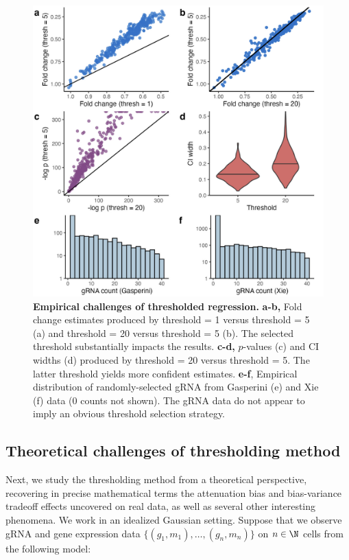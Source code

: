 \documentclass[12pt]{article}
\begin{document}
\begin{figure}[h!]
	\centering
	\includegraphics[width=1\linewidth]{../../figures/thresholding_empirical/plot}
	\caption{\textbf{Empirical challenges of thresholded regression.} \textbf{a-b,} Fold change estimates produced by threshold = 1 versus threshold = 5 (a) and threshold = 20 versus threshold = 5 (b). The selected threshold substantially impacts the results. \textbf{c-d,} $p$-values (c) and CI widths (d) produced by threshold = 20 versus threshold = 5. The latter threshold yields more confident estimates. \textbf{e-f}, Empirical distribution of randomly-selected gRNA from Gasperini (e) and Xie (f) data (0 counts not shown). The gRNA data do not appear to imply an obvious threshold selection strategy.}
	\label{thresholding_empirical}
\end{figure}
\newpage

\subsection{Theoretical challenges of thresholding method}\label{sec:thresholding_theory}

Next, we study the thresholding method from a theoretical perspective, recovering in precise mathematical terms the attenuation bias and bias-variance tradeoff effects uncovered on real data, as well as several other interesting phenomena.  We work in an idealized Gaussian setting. Suppose that we observe gRNA and gene expression data $\{(g_1, m_1), \dots, (g_n, m_n)\}$ on $n \in \N$ cells from the following model:
\end{document}
